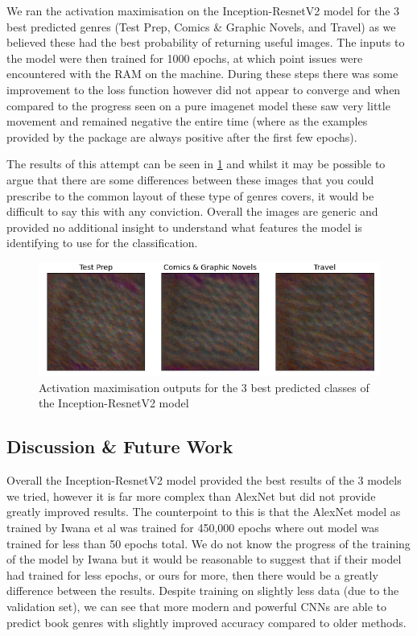 \documentclass[12pt]{article}
\numberwithin{equation}{section}
\numberwithin{figure}{section}
\begin{document}
We ran the activation maximisation on the Inception-ResnetV2 model for the 3 best predicted genres (Test Prep, Comics \& Graphic Novels, and Travel) as we believed these had the best probability of returning useful images. The inputs to the model were then trained for 1000 epochs, at which point issues were encountered with the RAM on the machine. During these steps there was some improvement to the loss function however did not appear to converge and when compared to the progress seen on a pure imagenet model these saw very little movement and remained negative the entire time (where as the examples provided by the package are always positive after the first few epochs). 

The results of this attempt can be seen in \cref{fig:act_max_output} and whilst it may be possible to argue that there are some differences between these images that you could prescribe to the common layout of these type of genres covers, it would be difficult to say this with any conviction. Overall the images are generic and provided no additional insight to understand what features the model is identifying to use for the classification.

\begin{figure}
	\centering
	\captionsetup{justification=centering}
	\includegraphics[scale=0.6]{visualize-dense-layer.png}
	\caption{Activation maximisation outputs for the 3 best predicted classes of the Inception-ResnetV2 model}
	\label{fig:act_max_output}
\end{figure}

\subsection{Discussion \& Future Work} 
\label{sub:Discussion} 
Overall the Inception-ResnetV2 model provided the best results of the 3 models we tried, however it is far more complex than AlexNet but did not provide greatly improved results. The counterpoint to this is that the AlexNet model as trained by Iwana et al was trained for 450,000 epochs where out model was trained for less than 50 epochs total. We do not know the progress of the training of the model by Iwana but it would be reasonable to suggest that if their model had trained for less epochs, or ours for more, then there would be a greatly difference between the results. Despite training on slightly less data (due to the validation set), we can see that more modern and powerful CNNs are able to predict book genres with slightly improved accuracy compared to older methods.
\end{document}
